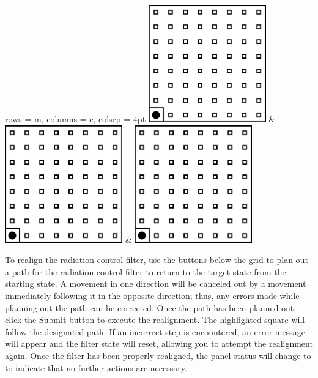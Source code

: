 \documentclass[12pt,draft]{article}
\newcommand{\status}[1]{\fbox{\texttt{#1}}}
\begin{document}
\begin{center}
\begin{tblr}{
 rows = {m}, columns = {c},
 colsep = 4pt
}
 \includegraphics[width=2in]{4} & \includegraphics[width=2in]{5} & \includegraphics[width=2in]{6}

\end{tblr}
\end{center}

To realign the radiation control filter, use the buttons below the grid to plan out a path for the radiation control filter to return to the target state from the starting state. A movement in one direction will be canceled out by a movement immediately following it in the opposite direction; thus, any errors made while planning out the path can be corrected. Once the path has been planned out, click the Submit button to execute the realignment. The highlighted square will follow the designated path. If an incorrect step is encountered, an error message will appear and the filter state will reset, allowing you to attempt the realignment again. Once the filter has been properly realigned, the panel status will change to \status{BB} to indicate that no further actions are necessary.
\end{document}
